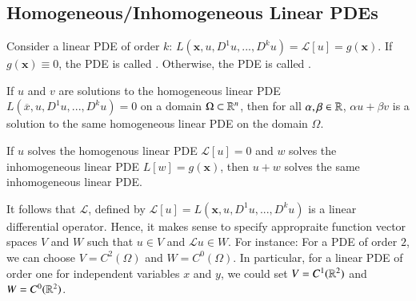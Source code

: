 \documentclass[12pt, a4paper, oneside, openright, titlepage]{book}
\begin{document}
\subsection{Homogeneous/Inhomogeneous Linear PDEs}

\begin{defn}
    Consider a linear PDE of order $k$: $L(\mathbf{x},u,D^1u,...,D^ku) = \mathcal{L}[u] = g(\mathbf{x})$. If $g(\mathbf{x}) \equiv 0$, the PDE is called . Otherwise, the PDE is called .
\end{defn}

\begin{thm}
    If $u$ and $v$ are solutions to the homogeneous linear PDE $L(\overline{x},u,D^1u,...,D^ku) = 0$ on a domain $\Omega\subset \mathbb R^n$, then for all $\alpha,\beta \in \mathbb R$, $\alpha u + \beta v$ is a solution to the same homogeneous linear PDE on the domain $\Omega$.
\end{thm}

\begin{thm}
    If $u$ solves the homogenous linear PDE $\mathcal{L}[u] = 0$ and $w$ solves the inhomogeneous linear PDE $L[w] = g(\mathbf{x})$, then $u+w$ solves the same inhomogeneous linear PDE.
\end{thm}

It follows that $\mathcal{L}$, defined by $\mathcal{L}[u] = L(\mathbf{x},u,D^1u,...,D^ku)$ is a linear differential operator. Hence, it makes sense to specify appropraite function vector spaces $V$ and $W$ such that $u \in V$ and $\mathcal{L}u \in W$. For instance: For a PDE of order $2$, we can choose $V = C^2(\Omega)$ and $W= C^0(\Omega)$. In particular, for a linear PDE of order one for independent variables $x$ and $y$, we could set $V = C^1(\mathbb R^2)$ and $W = C^0(\mathbb R^2)$.


\begin{appendices}


\end{appendices}
\end{document}
